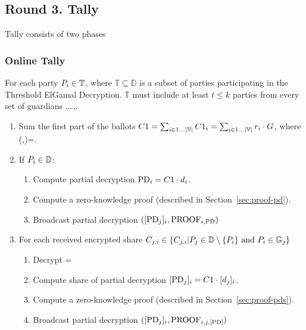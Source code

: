 \documentclass[runningheads]{llncs}
\begin{document}
\subsection{Round 3. Tally}

Tally consists of two phases
\subsubsection{Online Tally}

For each party $P_{i} \in \mathbb{T}$, where $\mathbb{T} \subseteq  \mathbb{D}$ is a subset of parties participating in the Threshold ElGamal Decryption. $\mathbb{T}$ must include at least $t \leq k$ parties from every set of guardians ,\dots,.
\begin{enumerate}
    \item Sum the first part of the ballots $C1 = \sum_{i \in 1 \dots |\mathbb{V}|} C1_{i} = \sum_{i \in 1 \dots |\mathbb{V}|} r_{i} \cdot G$, where (,)=.

    \item If $P_{i} \in \mathbb{D}$: \begin{enumerate}
        \item Compute partial decryption  $\mathrm{PD}_{i} = C1 \cdot d_{i}$.
        \item Compute a zero-knowledge proof  (described in Section~\ref{sec:proof-pd}).
        \item Broadcast partial decryption $([\mathrm{PD}_{j}]_{i}, \textrm{PROOF}_{i,\textrm{PD}})$
    \end{enumerate}
    
    \item For each received encrypted share $C_{j,i} \in \{ C_{j,i} | P_{j} \in \mathbb{D} \setminus \{P_{i}\} \text{ and } P_{i} \in \mathbb{G}_{j}\}$ \begin{enumerate}
        \item Decrypt =
        \item Compute share of partial decryption  $[\mathrm{PD}_{j}]_{i} = C1 \cdot [d_{j}]_{i}$. %
        \item Compute a zero-knowledge proof  (described in Section~\ref{sec:proof-pds}).
        \item Broadcast partial decryption $([\mathrm{PD}_{j}]_{i}, \textrm{PROOF}_{i,j,\textrm{[PD]}})$
    \end{enumerate}
    
\end{enumerate}
\end{document}
